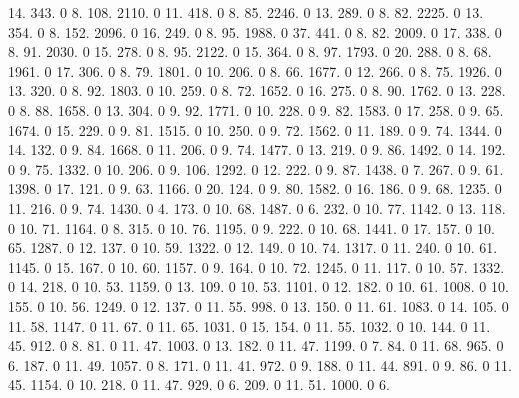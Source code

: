 14. 343. 0 8. 108. 2110. 0 11. 418. 0 8. 85. 2246. 0 13. 289. 0 8. 82. 2225. 0 13. 354. 0 8. 152. 2096. 0 16. 249. 0 8. 95. 1988. 0 37. 441. 0 8. 82. 2009. 0 17. 338. 0 8. 91. 2030. 0 15. 278. 0 8. 95. 2122. 0 15. 364. 0 8. 97. 1793. 0 20. 288. 0 8. 68. 1961. 0 17. 306. 0 8. 79. 1801. 0 10. 206. 0 8. 66. 1677. 0 12. 266. 0 8. 75. 1926. 0 13. 320. 0 8. 92. 1803. 0 10. 259. 0 8. 72. 1652. 0 16. 275. 0 8. 90. 1762. 0 13. 228. 0 8. 88. 1658. 0 13. 304. 0 9. 92. 1771. 0 10. 228. 0 9. 82. 1583. 0 17. 258. 0 9. 65. 1674. 0 15. 229. 0 9. 81. 1515. 0 10. 250. 0 9. 72. 1562. 0 11. 189. 0 9. 74. 1344. 0 14. 132. 0 9. 84. 1668. 0 11. 206. 0 9. 74. 1477. 0 13. 219. 0 9. 86. 1492. 0 14. 192. 0 9. 75. 1332. 0 10. 206. 0 9. 106. 1292. 0 12. 222. 0 9. 87. 1438. 0 7. 267. 0 9. 61. 1398. 0 17. 121. 0 9. 63. 1166. 0 20. 124. 0 9. 80. 1582. 0 16. 186. 0 9. 68. 1235. 0 11. 216. 0 9. 74. 1430. 0 4. 173. 0 10. 68. 1487. 0 6. 232. 0 10. 77. 1142. 0 13. 118. 0 10. 71. 1164. 0 8. 315. 0 10. 76. 1195. 0 9. 222. 0 10. 68. 1441. 0 17. 157. 0 10. 65. 1287. 0 12. 137. 0 10. 59. 1322. 0 12. 149. 0 10. 74. 1317. 0 11. 240. 0 10. 61. 1145. 0 15. 167. 0 10. 60. 1157. 0 9. 164. 0 10. 72. 1245. 0 11. 117. 0 10. 57. 1332. 0 14. 218. 0 10. 53. 1159. 0 13. 109. 0 10. 53. 1101. 0 12. 182. 0 10. 61. 1008. 0 10. 155. 0 10. 56. 1249. 0 12. 137. 0 11. 55. 998. 0 13. 150. 0 11. 61. 1083. 0 14. 105. 0 11. 58. 1147. 0 11. 67. 0 11. 65. 1031. 0 15. 154. 0 11. 55. 1032. 0 10. 144. 0 11. 45. 912. 0 8. 81. 0 11. 47. 1003. 0 13. 182. 0 11. 47. 1199. 0 7. 84. 0 11. 68. 965. 0 6. 187. 0 11. 49. 1057. 0 8. 171. 0 11. 41. 972. 0 9. 188. 0 11. 44. 891. 0 9. 86. 0 11. 45. 1154. 0 10. 218. 0 11. 47. 929. 0 6. 209. 0 11. 51. 1000. 0 6. 